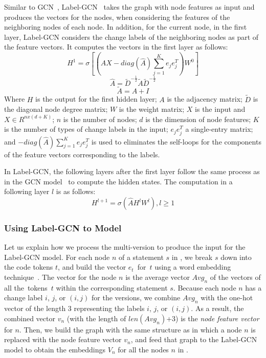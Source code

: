 Similar to GCN~\cite{gcn}, Label-GCN~\cite{label-gcn} takes the graph
with node features as input and produces the vectors for the nodes,
when considering the features of the neighboring nodes of each node.
In addition, for the current node, in the first layer, Label-GCN
considers the change labels of the neighboring nodes as part of the
feature vectors. It computes the vectors in the first layer as
follows:
\begin{equation}\label{eq1}
	H^1 = \sigma [(\hat{A}X-diag(\hat{A})\sum_{j=1}^{K}e_je^T_j)W^0]
\end{equation}
\begin{equation}\label{eq2}
	\hat{A} = \tilde{D}^{-\frac{1}{2}}\tilde{A}\tilde{D}^{-\frac{1}{2}}
\end{equation}
\begin{equation}\label{eq3}
	\tilde{A} = A + I
\end{equation}
Where $H$ is the output for the first hidden layer; $A$ is the
adjacency matrix; $\tilde{D}$ is the diagonal node degree matrix; $W$
is the weight matrix; $X$ is the input and $X \in R^{nx(d+K)}$; $n$ is
the number of nodes; $d$ is the dimension of node features; $K$ is the
number of types of change labels in the input; $e_je^T_j$ a single-entry
matrix; and $-diag(\hat{A})\sum_{j=1}^{K}e_je^T_j$ is used to
eliminates the self-loops for the components of the feature vectors
corresponding to the labels.


In Label-GCN, the following layers after the first layer follow the
same process as in the GCN model~\cite{gcn} to compute the hidden
states. The computation in a following layer $l$ is as follows:
\begin{equation}\label{eq4}
	H^{l+1} = \sigma (\hat{A}H^lW^l), l \geq 1
\end{equation}
\subsubsection{Using Label-GCN to Model {\mvpdg}}
\label{sec:preprocess}
Let us explain how we process the multi-version {\mvpdg} to produce
the input for the Label-GCN model. For each node $n$ of a statement
$s$ in {\mvpdg}, we break $s$ down into the code tokens $t$, and build
the vector $e_t$~for~$t$ using a word embedding
technique~\cite{glove2014}. The vector for the node $n$ is the average
vector $Avg_n$ of the vectors of all the~tokens~$t$ within the
corresponding statement $s$. Because each node $n$ has a change label
$i$, $j$, or $(i,j)$ for the versions, we combine $Avg_n$ with the
one-hot vector of the length 3 representing the labels $i$, $j$, or
$(i,j)$. As a result, the combined vector $v_n$ (with the length of
$len(Avg_n)$+3) is the {\em node feature vector} for $n$. Then, we
build the graph with the same structure as {\mvpdg} in which a node
$n$ is replaced with the node feature vector $v_n$, and feed that
graph to the Label-GCN model to obtain the embeddings $V_n$ for all
the nodes $n$ in {\mvpdg}.


